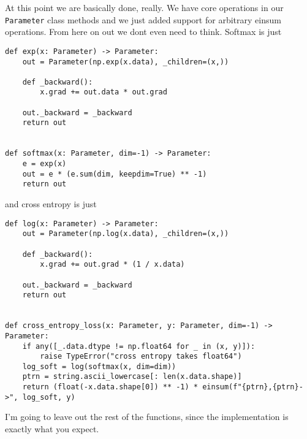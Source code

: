 \documentclass[11pt]{article}
\begin{document}
\par At this point we are basically done, really. We have core operations in our \texttt{Parameter} class methods and 
we just added support for arbitrary einsum operations. From here on out we dont even need to think. Softmax is just 
\begin{verbatim}
def exp(x: Parameter) -> Parameter:
    out = Parameter(np.exp(x.data), _children=(x,))

    def _backward():
        x.grad += out.data * out.grad

    out._backward = _backward
    return out


def softmax(x: Parameter, dim=-1) -> Parameter:
    e = exp(x)
    out = e * (e.sum(dim, keepdim=True) ** -1)
    return out
\end{verbatim}
 and cross entropy is just
 \begin{verbatim}
def log(x: Parameter) -> Parameter:
    out = Parameter(np.log(x.data), _children=(x,))

    def _backward():
        x.grad += out.grad * (1 / x.data)

    out._backward = _backward
    return out


def cross_entropy_loss(x: Parameter, y: Parameter, dim=-1) -> Parameter:
    if any([_.data.dtype != np.float64 for _ in (x, y)]):
        raise TypeError("cross entropy takes float64")
    log_soft = log(softmax(x, dim=dim))
    ptrn = string.ascii_lowercase[: len(x.data.shape)]
    return (float(-x.data.shape[0]) ** -1) * einsum(f"{ptrn},{ptrn}->", log_soft, y)
 \end{verbatim}
 I'm going to leave out the rest of the functions, since the implementation is exactly what you expect. 
\end{document}
